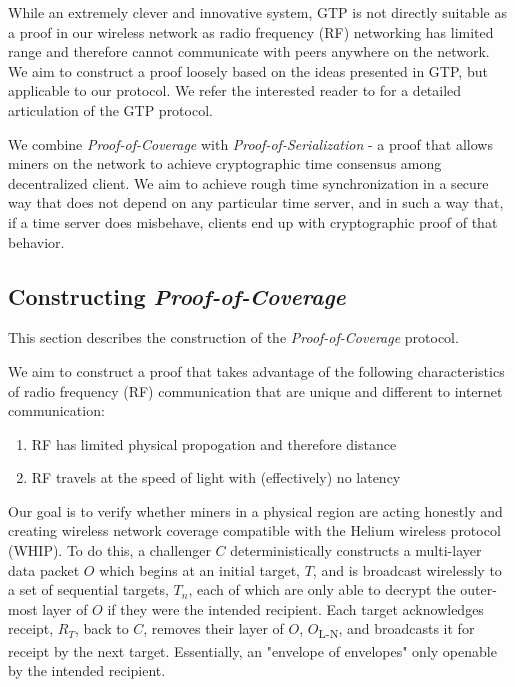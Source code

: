 \documentclass[letterpaper,11pt]{article}
\def\proofofcoverage/{\emph{Proof-of-Coverage}}
\begin{document}
While an extremely clever and innovative system, GTP is not directly suitable as a proof in our wireless network as radio frequency (RF) networking has limited range and therefore cannot communicate with peers anywhere on the network. We aim to construct a proof loosely based on the ideas presented in GTP, but applicable to our protocol. We refer the interested reader to \cite{gtp} for a detailed articulation of the GTP protocol.\newline

We combine \proofofcoverage/ with \emph{Proof-of-Serialization} - a proof that allows miners on the network to achieve cryptographic time consensus among decentralized client. We aim to achieve rough time synchronization in a secure way that does not depend on any particular time server, and in such a way that, if a time server does misbehave, clients end up with cryptographic proof of that behavior.

\subsection{Constructing \proofofcoverage/}

This section describes the construction of the \proofofcoverage/ protocol.\newline

We aim to construct a proof that takes advantage of the following characteristics of radio frequency (RF) communication that are unique and different to internet communication:

\begin{enumerate}
	\item RF has limited physical propogation and therefore distance
	\item RF travels at the speed of light with (effectively) no latency
\end{enumerate}

Our goal is to verify whether miners in a physical region are acting honestly and creating wireless network coverage compatible with the Helium wireless protocol (WHIP). To do this, a challenger $\mathit{C}$ deterministically constructs a multi-layer data packet $\mathit{O}$ which begins at an initial target, $\mathit{T}$, and is broadcast wirelessly to a set of sequential targets, $\mathit{T_n}$, each of which are only able to decrypt the outer-most layer of $\mathit{O}$ if they were the intended recipient. Each target acknowledges receipt, $\mathit{R_T}$, back to $\mathit{C}$, removes their layer of $\mathit{O}$, $\mathit{O}$\textsubscript{L-N}, and broadcasts it for receipt by the next target. Essentially, an "envelope of envelopes" only openable by the intended recipient.\newline
\end{document}
